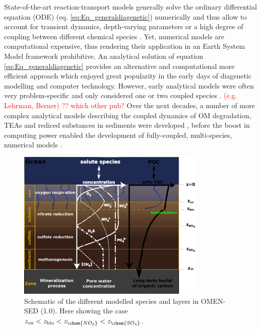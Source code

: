 \documentclass[gmd, manuscript]{copernicus}
\begin{document}
State-of-the-art reaction-transport models generally solve the ordinary differential equation (ODE) (eq. \ref{eq:Eq_generaldiagenetic}) numerically and thus allow to account for transient dynamics, 
depth-varying parameters or a high degree of coupling between different chemical species \citep[e.g.][]{soetaert_model_1996, aguilera_knowledge-based_2005}. 
Yet, numerical models are computational expensive, thus rendering their application in an Earth System Model framework prohibitive. An analytical solution of equation \eqref{eq:Eq_generaldiagenetic} 
provides an alternative and computational more efficient approach which enjoyed great popularity in the early days of diagenetic modelling and computer technology. %
However, early analytical models were often very problem-specific and only considered one or two coupled species \citep[e.g.][]{berner_idealized_1964}. \textcolor{red}{(e.g. Lehrman, Berner) ?? which other pub?}
Over the next decades, a number of more complex analytical models describing the coupled dynamics of OM degradation, TEAs and rediced substances in sediments were developed \citep[e.g.][]{billen1982modelling, goloway1982diagenetic, jahnke1982model}, 
before the boost in computing power enabled the development of fully-coupled, multi-species, numerical models \citep[e.g.][]{van1995metal, soetaert_model_1996}. 

\begin{figure}[htbp]
\begin{center}
	\includegraphics[width=0.8\textwidth]{figures/Sediment-model-with-profiles.pdf}
	\caption{Schematic of the different modelled species and layers in OMEN-SED (1.0). Here showing the case $z_{\mathrm{ox}} < z_{\mathrm{bio}} < z_{\chem{NO_3}} < z_{\chem{SO_4}}$.}
	\label{fig:Sediment_layers}
	\end{center}
\end{figure}
\end{document}
